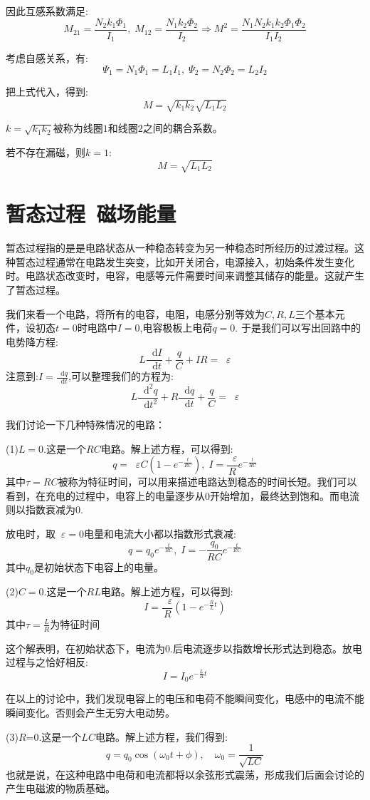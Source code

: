 \documentclass[12pt,a4paper,oneside]{report}
\theoremstyle{definition}
\theoremstyle{remark}
\renewcommand{\d}{\mathop{}\!\mathrm{d}}
\renewcommand{\v}{\mathop{}\!\varepsilon}
\begin{document}
因此互感系数满足:
\[
M_{21}=\frac{N_2k_1\Phi_1}{I_1},\;M_{12}=\frac{N_1k_2\Phi_2}{I_2}\Rightarrow M^2 =\frac{N_1N_2k_1k_2\Phi_1\Phi_2}{I_1I_2}
\]

考虑自感关系，有:
\[
\Psi_1 = N_1 \Phi_1 = L_1 I_1,\;\Psi_2 = N_2 \Phi_2 = L_2 I_2
\]

把上式代入，得到:
\[
M = \sqrt{k_1k_2}\sqrt{L_1L_2}
\]

$k=\sqrt{k_1k_2}$被称为线圈$1$和线圈$2$之间的耦合系数。

若不存在漏磁，则$k=1$:
\[
M=\sqrt{L_1L_2}
\]

\section{\texorpdfstring{暂态过程\, 磁场能量}{暂态过程 磁场能量}}
暂态过程指的是是电路状态从一种稳态转变为另一种稳态时所经历的过渡过程。这种暂态过程通常在电路发生突变，比如开关闭合，电源接入，初始条件发生变化时。电路状态改变时，电容，电感等元件需要时间来调整其储存的能量。这就产生了暂态过程。

我们来看一个电路，将所有的电容，电阻，电感分别等效为$C,R,L$三个基本元件，设初态$t=0$时电路中$I=0$,电容极板上电荷$q=0$. 于是我们可以写出回路中的电势降方程:
\[
L\frac{\d I}{\d t}+\frac{q}{C}+IR = \v
\]
注意到:$I=\frac{\d q}{\d t}$,可以整理我们的方程为:
\[
L\frac{\d^2 q}{\d t^2}+R\frac{\d q}{\d t}+\frac{q}{C}=\v
\]

我们讨论一下几种特殊情况的电路：

(1)$L=0$.这是一个$RC$电路。解上述方程，可以得到:
\[
q =\v C(1-e^{-\frac{t}{RC}}),\; I=\frac{\v}{R} e^{-\frac{t}{RC}}
\]
其中$\tau=RC$被称为特征时间，可以用来描述电路达到稳态的时间长短。我们可以看到，在充电的过程中，电容上的电量逐步从$0$开始增加，最终达到饱和。而电流则以指数衰减为$0$.

放电时，取$\v=0$电量和电流大小都以指数形式衰减:
\[
q = q_0e^{-\frac{t}{RC}},\; I = -\frac{q_0}{RC}e^{-\frac{t}{RC}}
\]
其中$q_0$是初始状态下电容上的电量。

(2)$C=0$.这是一个$RL$电路。解上述方程，可以得到:
\[
I =\frac{\v}{R}(1-e^{-\frac{R}{L}t})
\]
其中$\tau=\frac{L}{R}$为特征时间

这个解表明，在初始状态下，电流为$0$.后电流逐步以指数增长形式达到稳态。放电过程与之恰好相反:
\[
I = I_0 e^{-\frac{L}{R}t}
\]

在以上的讨论中，我们发现电容上的电压和电荷不能瞬间变化，电感中的电流不能瞬间变化。否则会产生无穷大电动势。

(3)$R$=0.这是一个$LC$电路。解上述方程，我们得到:
\[
q=q_0\cos(\omega_0 t+\phi),\quad \omega_0 = \frac{1}{\sqrt{LC}}
\]
也就是说，在这种电路中电荷和电流都将以余弦形式震荡，形成我们后面会讨论的产生电磁波的物质基础。
\end{document}
